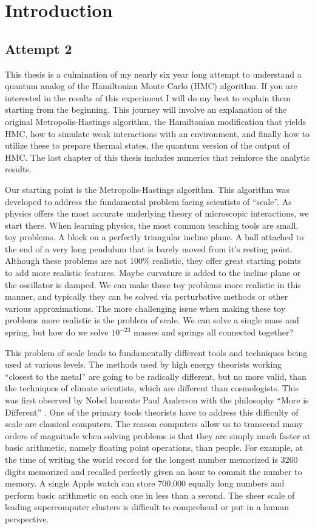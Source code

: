 \chapter{Introduction}

\section{Attempt 2}
This thesis is a culmination of my nearly six year long attempt to understand a quantum analog of the Hamiltonian Monte Carlo (HMC) algorithm. If you are interested in the results of this experiment I will do my best to explain them starting from the beginning. This journey will involve an explanation of the original Metropolis-Hastings algorithm, the Hamiltonian modification that yields HMC, how to simulate weak interactions with an environment, and finally how to utilize these to prepare thermal states, the quantum version of the output of HMC. The last chapter of this thesis includes numerics that reinforce the analytic results. 

Our starting point is the Metropolis-Hastings algorithm. This algorithm was developed to address the fundamental problem facing scientists of ``scale''. As physics offers the most accurate underlying theory of microscopic interactions, we start there. When learning physics, the most common teaching tools are small, toy problems. A block on a perfectly triangular incline plane. A ball attached to the end of a very long pendulum that is barely moved from it's resting point. Although these problems are not 100\% realistic, they offer great starting points to add more realistic features. Maybe curvature is added to the incline plane or the oscillator is damped. We can make these toy problems more realistic in this manner, and typically they can be solved via perturbative methods or other various approximations. The more challenging issue when making these toy problems more realistic is the problem of scale. We can solve a single mass and spring, but how do we solve $10^{-23}$ masses and springs all connected together? 

This problem of scale leads to fundamentally different tools and techniques being used at various levels. The methods used by high energy theorists working ``closest to the metal'' are going to be radically different, but no more valid, than the techniques of climate scientists, which are different than cosmologists. This was first observed by Nobel laureate Paul Anderson with the philosophy ``More is Different'' \cite{moreIsDifferent}. One of the primary tools theorists have to address this difficulty of scale are classical computers. The reason computers allow us to transcend many orders of magnitude when solving problems is that they are simply much faster at basic arithmetic, namely floating point operations, than people. For example, at the time of writing the world record for the longest number memorized is 3260 digits memorized and recalled perfectly given an hour to commit the number to memory. A single Apple watch can store 700,000 equally long numbers and perform basic arithmetic on each one in less than a second. The sheer scale of leading supercomputer clusters is difficult to comprehend or put in a human perspective. 

